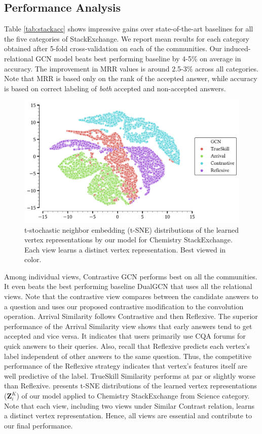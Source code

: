 \subsection{Performance Analysis}
Table \ref{tab:stackacc} shows impressive gains over state-of-the-art baselines for all the five categories of StackExchange. We report mean results for each category obtained after 5-fold cross-validation on each of the communities. Our induced-relational GCN model beats best performing baseline by 4-5\% on average in accuracy. The improvement in MRR values is around 2.5-3\% across all categories. Note that MRR is based only on the rank of the accepted answer, while accuracy is based on correct labeling of \emph{both} accepted and non-accepted answers.

\begin{figure}[h]
  \centering
  \includegraphics[scale=0.5]{figures/sne_plot.pdf}
  \caption{\label{fig:sne} t-stochastic neighbor embedding (t-SNE) \cite{sne} distributions of the learned vertex representations by our model for Chemistry StackExchange. Each view learns a distinct vertex representation. Best viewed in color.}
\end{figure}

Among individual views, Contrastive GCN performs best on all the communities. It even beats the best performing baseline DualGCN that uses all the relational views. Note that the contrastive view compares between the candidate answers to a question and uses our proposed contrastive modification to the convolution operation. Arrival Similarity follows Contrastive and then Reflexive. The superior performance of the Arrival Similarity view shows that early answers tend to get accepted and vice versa. It indicates that users primarily use CQA forums for quick answers to their queries. Also, recall that Reflexive predicts each vertex's label independent of other answers to the same question. Thus, the competitive performance of the Reflexive strategy indicates that vertex's features itself are well predictive of the label. TrueSkill Similarity performs at par or slightly worse than Reflexive.  presents t-SNE distributions \cite{sne} of the learned vertex representations ($\mathbf{Z}_i^K$) of our model applied to Chemistry StackExchange from Science category. Note that each view, including two views under Similar Contrast relation, learns a distinct vertex representation. Hence, all views are essential and contribute to our final performance.

